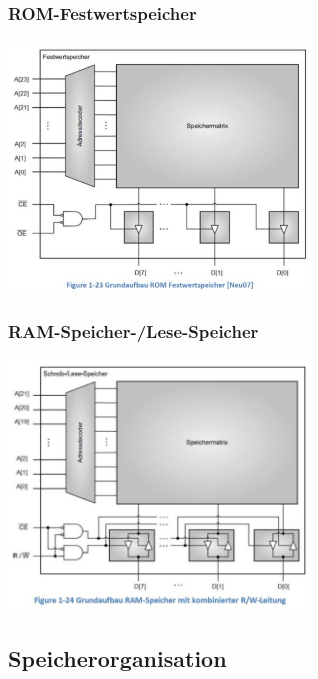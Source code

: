 \vspace{-1cm} 
\begin{multicols}{2}
\subsubsection{ROM-Festwertspeicher}
\includegraphics[width=8cm]{images/ROM}

\subsubsection{RAM-Speicher-/Lese-Speicher}
\includegraphics[width=8cm]{images/RAM}
\end{multicols}

\vspace{-1cm} 
\subsection{Speicherorganisation}

